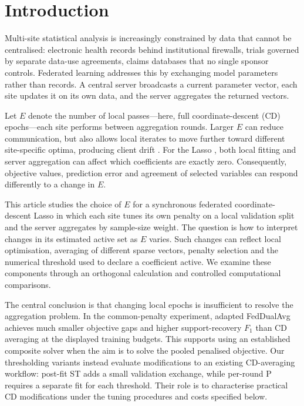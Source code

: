 \section{Introduction}
\label{sec:intro}

Multi-site statistical analysis is increasingly constrained by data that
cannot be centralised: electronic health records behind institutional
firewalls, trials governed by separate data-use agreements, claims
databases that no single sponsor controls. Federated learning
\citep{mcmahan2017,kairouz2021} addresses this by exchanging model
parameters rather than records. A central server broadcasts a current
parameter vector, each site updates it on its own data, and the server
aggregates the returned vectors.

Let $E$ denote the number of local passes---here, full coordinate-descent
(CD) epochs---each site performs between aggregation rounds. Larger $E$
can reduce communication, but also allows local iterates to move further
toward different site-specific optima, producing client drift
\citep{li2020convergence,karimireddy2020}. For the Lasso
\citep{tibshirani1996}, both local fitting and server aggregation can affect
which coefficients are exactly zero. Consequently, objective values,
prediction error and agreement of selected variables can respond
differently to a change in $E$.

This article studies the choice of $E$ for a synchronous federated
coordinate-descent Lasso in which each site tunes its own penalty on a
local validation split and the server aggregates by sample-size weight.
The question is how to interpret changes in its estimated active set as
$E$ varies. Such changes can reflect local optimisation, averaging of
different sparse vectors, penalty selection and the numerical threshold
used to declare a coefficient active. We examine these components through
an orthogonal calculation and controlled computational comparisons.

The central conclusion is that changing local epochs is insufficient to
resolve the aggregation problem. In the common-penalty experiment,
adapted FedDualAvg achieves much smaller objective gaps and higher
support-recovery $F_1$ than CD averaging at the displayed training budgets.
This supports using an established composite solver when the aim is to
solve the pooled penalised objective. Our thresholding variants instead
evaluate modifications to an existing CD-averaging workflow: post-fit ST
adds a small validation exchange, while per-round P requires a separate
fit for each threshold. Their role is to characterise practical CD
modifications under the tuning procedures and costs specified below.

